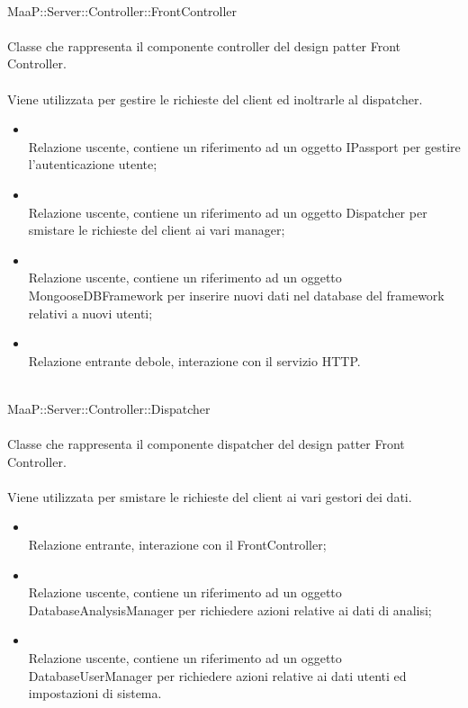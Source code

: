 	\\
	MaaP::Server::Controller::FrontController\\
	\\
	Classe che rappresenta il componente controller del design patter Front Controller.\\
	\\
	Viene utilizzata per gestire le richieste del client ed inoltrarle al dispatcher.
	\begin{itemize}
	\item{}\\
	Relazione uscente, contiene un riferimento ad un oggetto IPassport per gestire l'autenticazione utente;
	\item{}\\
	Relazione uscente, contiene un riferimento ad un oggetto Dispatcher per smistare le richieste del client ai vari manager;
	\item{}\\
	Relazione uscente, contiene un riferimento ad un oggetto MongooseDBFramework per inserire nuovi dati nel database del framework relativi a nuovi utenti;
	\item{}\\
	Relazione entrante debole, interazione con il servizio HTTP.
	\end{itemize}
	
	\\
	MaaP::Server::Controller::Dispatcher\\
	\\
	Classe che rappresenta il componente dispatcher del design patter Front Controller.\\
	\\
	Viene utilizzata per smistare le richieste del client ai vari gestori dei dati.
	\begin{itemize}
	\item{}\\
	Relazione entrante, interazione con il FrontController;
	\item{}\\
	Relazione uscente, contiene un riferimento ad un oggetto DatabaseAnalysisManager per richiedere azioni relative ai dati di analisi;
	\item{}\\
	Relazione uscente, contiene un riferimento ad un oggetto DatabaseUserManager per richiedere azioni relative ai dati utenti ed impostazioni di sistema.
	\end{itemize}


